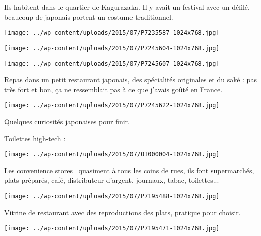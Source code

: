 \pagebreak
 Ils habitent dans le quartier de Kagurazaka. Il y avait un festival avec un défilé, beaucoup de japonais portent un costume traditionnel. 
\begin{center} \texttt{[image: ../wp-content/uploads/2015/07/P7235587-1024x768.jpg]} \end{center}
\begin{center} \texttt{[image: ../wp-content/uploads/2015/07/P7245604-1024x768.jpg]} \end{center}
\begin{center} \texttt{[image: ../wp-content/uploads/2015/07/P7245607-1024x768.jpg]} \end{center}

 Repas dans un petit restaurant japonais, des spécialités originales et du saké : pas très fort et bon, ça ne ressemblait pas à ce que j'avais goûté en France. 
\begin{center} \texttt{[image: ../wp-content/uploads/2015/07/P7245622-1024x768.jpg]} \end{center}

\pagebreak
 Quelques curiosités japonaises pour finir. 

 Toilettes high-tech :
\begin{center} \texttt{[image: ../wp-content/uploads/2015/07/OI000004-1024x768.jpg]} \end{center}

 Les \og convenience stores \fg\ quasiment à tous les coins de rues, ils font supermarchés, plats préparés, café, distributeur d'argent, journaux, tabac, toilettes...
\begin{center} \texttt{[image: ../wp-content/uploads/2015/07/P7195488-1024x768.jpg]} \end{center}

 Vitrine de restaurant avec des reproductions des plats, pratique pour choisir. 
\begin{center} \texttt{[image: ../wp-content/uploads/2015/07/P7195471-1024x768.jpg]} \end{center}
